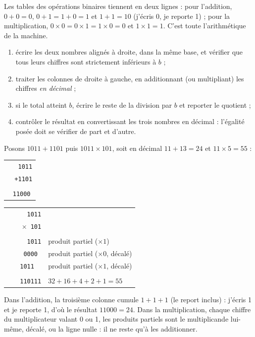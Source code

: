 Les tables des opérations binaires tiennent en deux lignes : pour l'addition, $0+0=0$, $0+1=1+0=1$ et $1+1=10$ (j'écris 0, je reporte 1) ; pour la multiplication, $0\times 0 = 0\times 1 = 1\times 0 = 0$ et $1 \times 1 = 1$. C'est toute l'arithmétique de la machine.

\begin{methode}
\begin{enumerate}
  \item écrire les deux nombres alignés à droite, dans la même base, et vérifier que tous leurs chiffres sont strictement inférieurs à $b$ ;
  \item traiter les colonnes de droite à gauche, en additionnant (ou multipliant) les chiffres \emph{en décimal} ;
  \item si le total atteint $b$, écrire le reste de la division par $b$ et reporter le quotient ;
  \item contrôler le résultat en convertissant les trois nombres en décimal : l'égalité posée doit se vérifier de part et d'autre.
\end{enumerate}
\end{methode}

\begin{exemple}
Posons $1011 + 1101$ puis $1011 \times 101$, soit en décimal $11 + 13 = 24$ et $11 \times 5 = 55$ :
\begin{center}
\begin{tabular}{c}
\texttt{\ \ \ 1011}\\
\texttt{\ \ +1101}\\
\texttt{\ \rule{1.5cm}{0.4pt}}\\
\texttt{\ 11000}\\
\end{tabular}
\qquad
\begin{tabular}{rl}
\texttt{\ \ \ \ \ 1011} & \phantom{xxxxxxxxxxxx}\\
\texttt{\ \ \ \ $\times$\ 101} & \\
\texttt{\ \ \rule{1.5cm}{0.4pt}} & \\
\texttt{\ \ \ \ \ 1011} & produit partiel ($\times 1$)\\
\texttt{\ \ \ 0000\ } & produit partiel ($\times 0$, décalé)\\
\texttt{\ \ 1011\ \ } & produit partiel ($\times 1$, décalé)\\
\texttt{\ \rule{1.5cm}{0.4pt}} & \\
\texttt{\ \ 110111} & $32+16+4+2+1 = 55$\\
\end{tabular}
\end{center}
Dans l'addition, la troisième colonne cumule $1+1+1$ (le report inclus) : j'écris 1 et je reporte 1, d'où le résultat $11000 = 24$. Dans la multiplication, chaque chiffre du multiplicateur valant 0 ou 1, les produits partiels sont le multiplicande lui-même, décalé, ou la ligne nulle : il ne reste qu'à les additionner.
\end{exemple}

